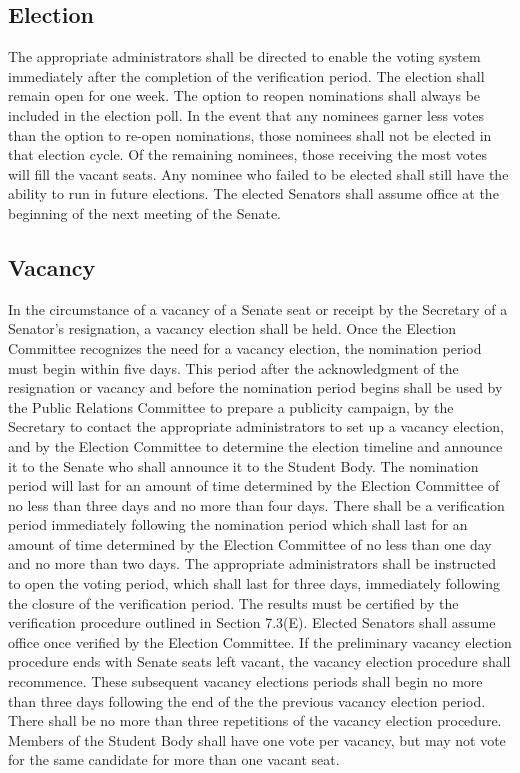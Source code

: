 \documentclass[12pt]{scrreprt}
\begin{document}
\subsection{Election}
The appropriate administrators shall be directed to enable the voting system 
immediately after the completion of the verification period. The election 
shall remain open for one week. The option to reopen nominations shall always be included in the election poll. In the event that any nominees garner less votes than the option to re-open nominations, those nominees shall not be elected in that election cycle. Of the remaining nominees, those receiving the most votes will fill the vacant seats. Any nominee who failed to be elected shall still have the ability to run in future elections. The elected Senators shall assume office at the beginning of the next meeting of the Senate.

\subsection{Vacancy}
In the circumstance of a vacancy of a Senate seat or receipt by the Secretary of a
Senator’s resignation, a vacancy election shall be held. Once the Election
Committee recognizes the need for a vacancy election, the nomination period must
begin within five days. This period after the acknowledgment of the resignation or
vacancy and before the nomination period begins shall be used by the Public
Relations Committee to prepare a publicity campaign, by the Secretary to contact
the appropriate administrators to set up a vacancy election, and by the Election
Committee to determine the election timeline and announce it to the Senate who
shall announce it to the Student Body. The nomination period will last for an
amount of time determined by the Election Committee of no less than three days
and no more than four days. There shall be a verification period immediately following the nomination period which shall last for an amount of time determined
by the Election Committee of no less than one day and no more than two days. The
appropriate administrators shall be instructed to open the voting period, which shall
last for three days, immediately following the closure of the verification period.
The results must be certified by the verification procedure outlined in Section
7.3(E). Elected Senators shall assume office once verified by the Election
Committee. If the preliminary vacancy election procedure ends with Senate seats left vacant,
the vacancy election procedure shall recommence. These subsequent vacancy
elections periods shall begin no more than three days following the end of the the
previous vacancy election period. There shall be no more than three repetitions of
the vacancy election procedure. Members of the Student Body shall have one vote
per vacancy, but may not vote for the same candidate for more than one vacant
seat.
\end{document}
